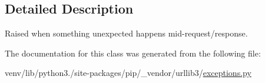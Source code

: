 \subsection{Detailed Description}
\begin{DoxyVerb}Raised when something unexpected happens mid-request/response.\end{DoxyVerb}
 

The documentation for this class was generated from the following file\+:\begin{DoxyCompactItemize}
\item 
venv/lib/python3./site-\/packages/pip/\+\_\+vendor/urllib3/\hyperlink{pip_2__vendor_2urllib3_2exceptions_8py}{exceptions.\+py}\end{DoxyCompactItemize}
